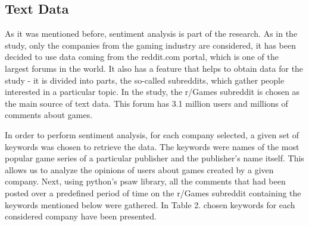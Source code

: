 \documentclass[11pt]{article} %
\begin{document}
\subsection{Text Data}
As it was mentioned before, sentiment analysis is part of the research. As in the study, only the companies from the gaming industry are considered, it has been decided to use data coming from the reddit.com portal, which is one of the largest forums in the world. It also has a feature that helps to obtain data for the study - it is divided into parts, the so-called subreddits, which gather people interested in a particular topic. In the study, the r/Games subreddit is chosen as the main source of text data. This forum has 3.1 million users and millions of comments about games. 

In order to perform sentiment analysis, for each company selected, a given set of keywords was chosen to retrieve the data. The keywords were names of the most popular game series of a particular publisher and the publisher's name itself. This allows us to analyze the opinions of users about games created by a given company. Next, using python's psaw library,  all the comments that had been posted over a predefined period of time on the r/Games subreddit containing the keywords mentioned below were gathered. In Table 2. chosen keywords for each considered company have been presented. 
\end{document}
